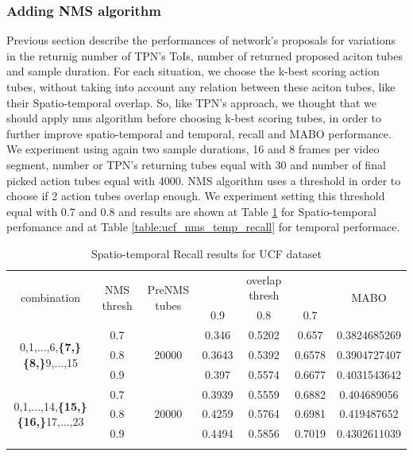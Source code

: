 \documentclass{report}
\begin{document}
\subsubsection{Adding NMS algorithm}

Previous section describe the performances of network's proposals for variations in the returnig number of TPN's ToIs, number of returned
proposed aciton tubes and sample duration. For each situation, we choose the k-best scoring action tubes, without taking into account
any relation between these aciton tubes, like their Spatio-temporal overlap. So, like TPN's approach, we thought that we should apply
nms algorithm before choosing k-best scoring tubes, in order to further improve  spatio-temporal and temporal, recall and MABO  performance.
We experiment using again two sample durations, 16 and 8 frames per video segment, number or TPN's returning tubes equal with 30 and
number of final picked action tubes equal with 4000. NMS algorithm uses a threshold in order to choose if 2 action tubes overlap enough. We
experiment setting this threshold equal with 0.7 and 0.8 and results are shown at Table \ref{table:ucf_nms_recall} for Spatio-temporal
perfomance and at Table \ref{table:ucf_nms_temp_recall} for temporal performace.

\begin{center}
  \setlength{\tabcolsep}{2pt}
\begin{longtable}{||c | c | c | c c c| c|}

  \hline
  \multirow{2}{*}{combination} & \multirow{2}{2.5em}{NMS thresh} & \multirow{2}{3.5em}{PreNMS tubes} &  {} &overlap thresh & {} & \multirow{2}{*}{MABO} \\
  {} & {} & {} &  0.9 &  0.8 & 0.7 & {}\\         
  \hline
  \multirow{3}{7em}{0,1,...,6,\textbf{\{7,\}}
  \textbf{\{8,\}}9,...,15 }  & 0.7 &\multirow{3}{*}{20000}  & 0.346 & 0.5202 & 0.657 & 0.3824685269 \\
  \cline{2-2} \cline{4-7} 
  {} &  0.8   & {}   & 0.3643 & 0.5392 & 0.6578 & 0.3904727407 \\
  \cline{2-2} \cline{4-7} 
  {} &  0.9   & {}   & 0.397  & 0.5574 & 0.6677 & 0.4031543642 \\
  \hline                                    
  \multirow{3}{7em}{0,1,...,14,\textbf{\{15,\}}
  \textbf{\{16,\}}17,...,23 }  & 0.7 & \multirow{3}{*}{20000}   & 0.3939 & 0.5559  & 0.6882 & 0.404689056 \\
  \cline{2-2} \cline{4-7} 
                                    {} &  0.8   & {}   & 0.4259 & 0.5764 & 0.6981 & 0.419487652 \\
  \cline{2-2} \cline{4-7} 
                                    {} &  0.9   & {}   & 0.4494 & 0.5856 & 0.7019 & 0.4302611039 \\

  \hline                                    

  \caption{Spatio-temporal Recall results for UCF dataset}
  \label{table:ucf_nms_recall}
\end{longtable} 
\end{center}
\end{document}
